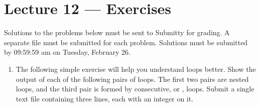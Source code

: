 \documentclass[letterpaper,10pt,english]{sphinxmanual}
\begin{document}
\chapter{Lecture 12 — Exercises}
\label{\detokenize{lecture_notes/lec12_loops2_exercises/exercises:lecture-12-exercises}}\label{\detokenize{lecture_notes/lec12_loops2_exercises/exercises::doc}}
Solutions to the problems below must be sent to Submitty for grading.
A separate file must be submitted for each problem. Solutions must be
submitted by 09:59:59 am on Tuesday, February 26.
\begin{enumerate}
\def\theenumi{\arabic{enumi}}
\def\labelenumi{\theenumi .}
\makeatletter\def\p@enumii{\p@enumi \theenumi .}\makeatother
\item {} 
The following simple exercise will help you understand loops better.
Show the output of each of the following pairs of  loops. The
first two pairs are nested loops, and the third pair is formed by
consecutive, or , loops. Submit a single text file
containing three lines, each with an integer on it.

\begin{sphinxVerbatim}[commandchars=\\\{\}]
  
   
       
          
\end{sphinxVerbatim}

\begin{sphinxVerbatim}[commandchars=\\\{\}]
  
   
          
          
\end{sphinxVerbatim}

\begin{sphinxVerbatim}[commandchars=\\\{\}]
  
   
      
   
      
\end{sphinxVerbatim}


\end{enumerate}
\end{document}
